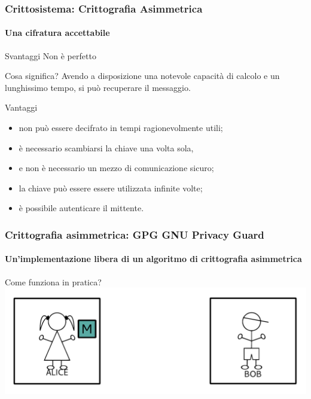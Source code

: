 \documentclass{beamer}
\begin{document}
\begin{frame}
\end{frame}

\begin{frame}
  \frametitle{Crittosistema: Crittografia Asimmetrica}
  \framesubtitle{Una cifratura accettabile}

  \begin{block}{Svantaggi}
    Non è perfetto
  \end{block}

  \begin{exampleblock}{Cosa significa?}
  Avendo a disposizione una notevole capacità di calcolo e un lunghissimo tempo,
  si può recuperare il messaggio.
  \end{exampleblock}

  \pause
  \begin{block}{Vantaggi}
    \begin{itemize}
      \item non può essere decifrato in tempi ragionevolmente utili;
      \item è necessario scambiarsi la chiave una volta sola,
      \item e non è necessario un mezzo di comunicazione sicuro;
      \item la chiave può essere essere utilizzata infinite volte;
      \item è possibile autenticare il mittente.
    \end{itemize}
  \end{block}

\end{frame}

\begin{frame}
  \frametitle{Crittografia asimmetrica: GPG GNU Privacy Guard}
  \framesubtitle{Un'implementazione libera di un algoritmo di crittografia asimmetrica}

  \begin{block}{Come funziona in pratica?}
    \centering
    \includegraphics[width=.9\linewidth]{ab0.pdf}
  \end{block}
\end{frame}
\end{document}
